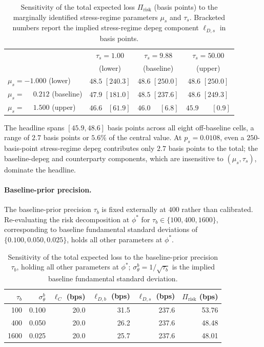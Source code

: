 \begin{table}[H]
\centering
\caption{Sensitivity of the total expected loss $\Pi_{\text{risk}}$ (basis points) to the marginally identified stress-regime parameters $\mu_s$ and $\tau_s$. Bracketed numbers report the implied stress-regime depeg component $\ell_{D,s}$ in basis points.}\label{tab:sensitivity}
\begin{tabular}{lccc}
\toprule
& $\tau_s = 1.00$ & $\tau_s = 9.88$ & $\tau_s = 50.00$ \\
& (lower)         & (baseline)      & (upper)           \\
\midrule
$\mu_s = -1.000$ (lower)    & $48.5$ $[240.3]$ & $48.6$ $[250.0]$ & $48.6$ $[250.0]$ \\
$\mu_s = \phantom{-}0.212$ (baseline) & $47.9$ $[181.0]$ & $\mathbf{48.5}$ $[\mathbf{237.6}]$ & $48.6$ $[249.3]$ \\
$\mu_s = \phantom{-}1.500$ (upper)    & $46.6$ $\phantom{0}[61.9]$  & $46.0$ $\phantom{00}[6.8]$  & $45.9$ $\phantom{000}[0.9]$ \\
\bottomrule
\end{tabular}
\end{table}

The headline spans $[45.9, 48.6]$ basis points across all eight off-baseline cells, a range of $2.7$ basis points or $5.6\%$ of the central value. At $p_s = 0.0108$, even a $250$-basis-point stress-regime depeg contributes only $2.7$ basis points to the total; the baseline-depeg and counterparty components, which are insensitive to $(\mu_s, \tau_s)$, dominate the headline.

\paragraph{Baseline-prior precision.} The baseline-prior precision $\tau_b$ is fixed externally at $400$ rather than calibrated. Re-evaluating the risk decomposition at $\phi^*$ for $\tau_b \in \{100, 400, 1600\}$, corresponding to baseline fundamental standard deviations of $\{0.100, 0.050, 0.025\}$, holds all other parameters at $\phi^*$.

\begin{table}[H]
\centering
\caption{Sensitivity of the total expected loss to the baseline-prior precision $\tau_b$, holding all other parameters at $\phi^*$; $\sigma_\theta^b = 1/\sqrt{\tau_b}$ is the implied baseline fundamental standard deviation.}\label{tab:sens_tau_b}
\begin{tabular}{rrrrrr}
\toprule
$\tau_b$ & $\sigma_\theta^b$ & $\ell_C$ (bps) & $\ell_{D,b}$ (bps) & $\ell_{D,s}$ (bps) & $\Pi_{\text{risk}}$ (bps) \\
\midrule
100  & 0.100 & 20.0 & 31.5 & 237.6 & 53.76 \\
400  & 0.050 & 20.0 & 26.2 & 237.6 & 48.48 \\
1600 & 0.025 & 20.0 & 25.7 & 237.6 & 48.01 \\
\bottomrule
\end{tabular}
\end{table}

